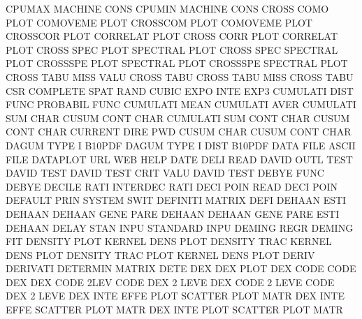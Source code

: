 CPUMAX                                  MACHINE  CONS
CPUMIN                                  MACHINE  CONS
CROSS    COMO PLOT                      COMOVEME PLOT
CROSSCOM PLOT                           COMOVEME PLOT
CROSSCOR PLOT                           CORRELAT PLOT
CROSS    CORR PLOT                      CORRELAT PLOT
CROSS    SPEC PLOT                      SPECTRAL PLOT
CROSS    SPEC                           SPECTRAL PLOT
CROSSSPE PLOT                           SPECTRAL PLOT
CROSSSPE                                SPECTRAL PLOT
CROSS    TABU MISS VALU                 CROSS    TABU
CROSS    TABU MISS                      CROSS    TABU
CSR                                     COMPLETE SPAT RAND
CUBIC    EXPO INTE                      EXP3
CUMULATI DIST FUNC                      PROBABIL FUNC
CUMULATI MEAN                           CUMULATI AVER
CUMULATI SUM  CHAR                      CUSUM    CONT CHAR
CUMULATI SUM  CONT CHAR                 CUSUM    CONT CHAR
CURRENT  DIRE                           PWD
CUSUM    CHAR                           CUSUM    CONT CHAR
DAGUM    TYPE I                         B10PDF
DAGUM    TYPE I    DIST                 B10PDF
DATA     FILE                           ASCII    FILE
DATAPLOT URL                            WEB      HELP
DATE     DELI                           READ
DAVID    OUTL TEST                      DAVID    TEST
DAVID    TEST CRIT VALU                 DAVID    TEST
DEBYE    FUNC                           DEBYE
DECILE   RATI                           INTERDEC RATI
DECI     POIN                           READ     DECI POIN 
DEFAULT  PRIN                           SYSTEM   SWIT
DEFINITI                                MATRIX   DEFI
DEHAAN   ESTI                           DEHAAN
DEHAAN   GENE PARE                      DEHAAN
DEHAAN   GENE PARE ESTI                 DEHAAN
DELAY    STAN INPU                      STANDARD INPU
DEMING   REGR                           DEMING   FIT
DENSITY  PLOT                           KERNEL   DENS PLOT
DENSITY  TRAC                           KERNEL   DENS PLOT
DENSITY  TRAC PLOT                      KERNEL   DENS PLOT
DERIV                                   DERIVATI
DETERMIN                                MATRIX   DETE
DEX                                     DEX      PLOT
DEX      CODE                           CODE     DEX
DEX      CODE 2LEV                      CODE     DEX  2    LEVE
DEX      CODE 2    LEVE                 CODE     DEX  2    LEVE
DEX      INTE EFFE PLOT                 SCATTER  PLOT MATR
DEX      INTE EFFE                      SCATTER  PLOT MATR
DEX      INTE PLOT                      SCATTER  PLOT MATR
